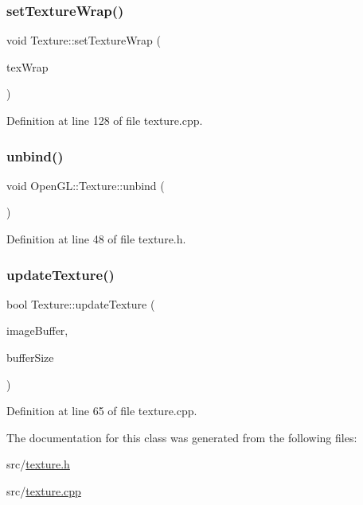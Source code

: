 \subsubsection{\texorpdfstring{setTextureWrap()}{setTextureWrap()}}
{\footnotesize\ttfamily void Texture\+::set\+Texture\+Wrap (\begin{DoxyParamCaption}\item[{\mbox{\hyperlink{namespace_open_g_l_a22eb6a3df5ed600fb89f2baf8d1c8027}{Texture\+Wrap}}}]{tex\+Wrap }\end{DoxyParamCaption})}



Definition at line 128 of file texture.\+cpp.

\mbox{\label{class_open_g_l_1_1_texture_a762d9b99b7eb49845da1e37009d1fe5d}} 
\subsubsection{\texorpdfstring{unbind()}{unbind()}}
{\footnotesize\ttfamily void Open\+G\+L\+::\+Texture\+::unbind (\begin{DoxyParamCaption}{ }\end{DoxyParamCaption})\hspace{0.3cm}{\ttfamily [inline]}}



Definition at line 48 of file texture.\+h.

\mbox{\label{class_open_g_l_1_1_texture_ae129740a08ae6255eecd6d399a27c2bd}} 
\subsubsection{\texorpdfstring{updateTexture()}{updateTexture()}}
{\footnotesize\ttfamily bool Texture\+::update\+Texture (\begin{DoxyParamCaption}\item[{unsigned char $\ast$}]{image\+Buffer,  }\item[{unsigned int}]{buffer\+Size }\end{DoxyParamCaption})}



Definition at line 65 of file texture.\+cpp.



The documentation for this class was generated from the following files\+:\begin{DoxyCompactItemize}
\item 
src/\mbox{\hyperlink{texture_8h}{texture.\+h}}\item 
src/\mbox{\hyperlink{texture_8cpp}{texture.\+cpp}}\end{DoxyCompactItemize}
